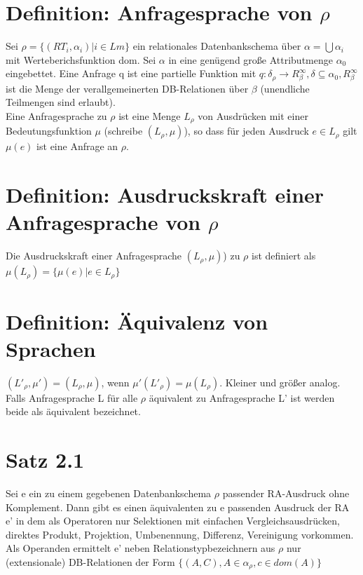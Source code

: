\documentclass[12pt, a4paper]{article}
\begin{document}
\section*{Definition: Anfragesprache von $\rho$}
Sei $\rho = \{ (RT_i, \alpha_i) | i \in Lm \}$ ein relationales Datenbankschema über $\alpha = \bigcup \alpha_i$ mit Werteberichsfunktion dom. Sei $\alpha$ in eine genügend große Attributmenge $\alpha_0$ eingebettet. Eine Anfrage q ist eine partielle Funktion mit $q: \delta_\rho \rightarrow R^{\infty}_\beta,  \delta \subseteq \alpha_0, R^{\infty}_\beta$ ist die Menge der verallgemeinerten DB-Relationen über $\beta$ (unendliche Teilmengen sind erlaubt). \\
Eine Anfragesprache zu $\rho$ ist eine Menge $L_\rho$ von Ausdrücken mit einer Bedeutungsfunktion $\mu$ (schreibe $(L_\rho, \mu)$), so dass für jeden Ausdruck $e \in L_\rho$ gilt $\mu(e)$ ist eine Anfrage an $\rho$.

\section*{Definition: Ausdruckskraft einer Anfragesprache von $\rho$}
Die Ausdruckskraft einer Anfragesprache $(L_\rho, \mu)$) zu $\rho$ ist definiert als $\mu(L_\rho) = \{ \mu(e) | e \in L_\rho \}$

\section*{Definition: Äquivalenz von Sprachen}
$(L'_\rho, \mu') = (L_\rho, \mu)$, wenn $\mu'(L'_\rho) = \mu(L_\rho)$. Kleiner und größer analog.
Falls Anfragesprache L für alle $\rho$ äquivalent zu Anfragesprache L' ist werden beide als äquivalent bezeichnet.

\section*{Satz 2.1}
Sei e ein zu einem gegebenen Datenbankschema $\rho$ passender RA-Ausdruck ohne Komplement. Dann gibt es einen äquivalenten zu e passenden Ausdruck der RA e' in dem als Operatoren nur Selektionen mit einfachen Vergleichsausdrücken, direktes Produkt, Projektion, Umbenennung, Differenz, Vereinigung vorkommen. Als Operanden ermittelt e' neben Relationstypbezeichnern aus $\rho$ nur (extensionale) DB-Relationen der Form $\{(A, C), A \in \alpha_\rho, c \in dom(A) \} $\\
\end{document}

